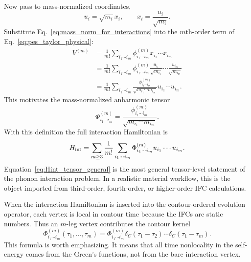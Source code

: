 Now pass to mass-normalized coordinates,
\begin{equation}
    u_i = \sqrt{m_i}x_i,
    \qquad
    x_i = \frac{u_i}{\sqrt{m_i}}.
    \label{eq:mass_norm_for_interactions}
\end{equation}
Substitute Eq.~\eqref{eq:mass_norm_for_interactions} into the $m$th-order term of Eq.~\eqref{eq:pes_taylor_physical}:
\begin{align}
    V^{(m)}
    &= \frac{1}{m!}\sum_{i_1\cdots i_m}\phi^{(m)}_{i_1\cdots i_m}
       x_{i_1}\cdots x_{i_m} \\
    &= \frac{1}{m!}\sum_{i_1\cdots i_m}\phi^{(m)}_{i_1\cdots i_m}
       \frac{u_{i_1}}{\sqrt{m_{i_1}}}\cdots \frac{u_{i_m}}{\sqrt{m_{i_m}}} \\
    &= \frac{1}{m!}\sum_{i_1\cdots i_m}
       \frac{\phi^{(m)}_{i_1\cdots i_m}}{\sqrt{m_{i_1}\cdots m_{i_m}}}
       u_{i_1}\cdots u_{i_m}.
\end{align}
This motivates the mass-normalized anharmonic tensor
\begin{equation}
    \Phi^{(m)}_{i_1\cdots i_m}
    =
    \frac{\phi^{(m)}_{i_1\cdots i_m}}{\sqrt{m_{i_1}\cdots m_{i_m}}}.
    \label{eq:mass_norm_ifc_general_again}
\end{equation}
With this definition the full interaction Hamiltonian is
\begin{equation}
    H_{\rm int}
    =
    \sum_{m\ge 3}
    \frac{1}{m!}
    \sum_{i_1\cdots i_m}
    \Phi^{(m)}_{i_1\cdots i_m}
    u_{i_1}\cdots u_{i_m}.
    \label{eq:Hint_tensor_general}
\end{equation}
Equation~\eqref{eq:Hint_tensor_general} is the most general tensor-level statement of the phonon interaction problem. In a realistic material workflow, this is the object imported from third-order, fourth-order, or higher-order IFC calculations.

When the interaction Hamiltonian is inserted into the contour-ordered evolution operator, each vertex is local in contour time because the IFCs are static numbers. Thus an $m$-leg vertex contributes the contour kernel
\begin{equation}
    \Phi^{(m)}_{i_1\cdots i_m}(\tau_1,\ldots,\tau_m)
    =
    \Phi^{(m)}_{i_1\cdots i_m}
    \delta_C(\tau_1-\tau_2)\cdots \delta_C(\tau_1-\tau_m).
    \label{eq:local_contour_vertex_again}
\end{equation}
This formula is worth emphasizing. It means that all time nonlocality in the self-energy comes from the Green's functions, not from the bare interaction vertex.

